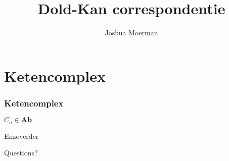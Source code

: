 \documentclass{beamer}
\title{Dold-Kan correspondentie}
\author{Joshua Moerman}
\institute[Radboud Universiteit Nijmegen]{Begeleid door Moritz Groth}
\date{}
\newcommand{\cat}[1]{\mathbf{#1}}
\begin{document}
\begin{frame}
  \titlepage
\end{frame}



\section{Ketencomplex}
\begin{frame}
\frametitle{Ketencomplex}
\begin{definition}
	$C_n \in \cat{Ab}$
\end{definition}
\pause
Enzoverder
\end{frame}



\begin{frame}
\begin{center}
\Huge Questions?
\end{center}
\end{frame}
\end{document}
